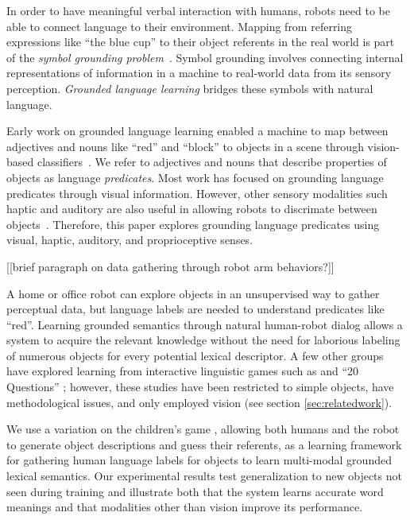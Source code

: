 In order to have meaningful verbal interaction with humans, robots need to be
able to connect language to their environment.  Mapping from referring
expressions like ``the blue cup'' to their object referents in the real world
is part of the \textit{symbol grounding problem}~\cite{harnad:phys90}.  Symbol
grounding involves connecting internal representations of information in a
machine to real-world data from its sensory perception. \textit{Grounded
language learning} bridges these symbols with natural language.

Early work on grounded language learning enabled a machine to map between adjectives and nouns like ``red'' and ``block'' to objects in a scene through vision-based classifiers~\cite{roy:evocomm01}.
We refer to adjectives and nouns that describe properties of objects as language \textit{predicates}.
Most work has focused on grounding language predicates through visual information.
However, other sensory modalities such haptic and auditory are also useful in
allowing robots to discrimate between objects~\cite{sinapov:icra14}. Therefore, this paper explores grounding language predicates using visual, haptic, auditory, and proprioceptive senses. 

[[brief paragraph on data gathering through robot arm behaviors?]]

A home or office robot can explore objects in an unsupervised way to gather perceptual data, but language labels are needed to understand predicates like ``red''.
Learning grounded semantics through natural human-robot dialog allows a system to acquire the relevant knowledge without the need for laborious labeling of numerous objects for every potential lexical descriptor.
A few other groups have explored learning from interactive linguistic games such as \ispy and ``20 Questions'' \cite{parde:ijcai15,vogel:aaai10}; however, these studies have been restricted to simple objects, have methodological issues, and only employed vision (see section \ref{sec:relatedwork}).

We use a variation on the children's game \ispy, allowing both humans and the
robot to generate object descriptions and guess their referents, as a
learning framework for gathering human language labels for objects to learn
multi-modal grounded lexical semantics.  Our experimental results test
generalization to new objects not seen during training and illustrate both that
the system learns accurate word meanings and that modalities other than vision
improve its performance.
